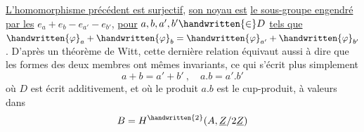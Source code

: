 \uline{L'homomorphisme précédent est surjectif}, \uline{son noyau est}  \uline{le sous-groupe engendré par les} $e_a+e_b-e_{a'}-e_{b'}$, \uline{pour} $a,b,a',b'\handwritten{\in}D$ \uline{tels que} $\handwritten{\varphi}_a+\handwritten{\varphi}_b=\handwritten{\varphi}_{a'}+\handwritten{\varphi}_{b'}$. D'après un théorème de Witt, cette dernière relation équivaut aussi à dire que les formes des deux membres ont mêmes invariants, ce qui s'écrit plus simplement
\reversemarginpar
{}
\normalmarginpar
\[
a+b=a'+b'\ ,\quad a.b=a'.b'
\]
où $D$ est écrit additivement, et où le produit $a.b$ est le cup-produit, à valeurs dans
\[
B=H^{\handwritten{2}}(A,\underline{Z}/2\underline{Z})
\]
